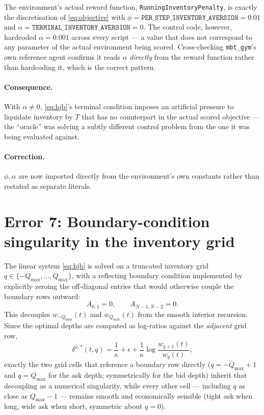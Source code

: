 \documentclass[11pt]{article}
\begin{document}
The environment's actual reward function, \texttt{RunningInventoryPenalty}, is exactly the discretisation of \eqref{eq:objective} with $\phi = \texttt{PER\_STEP\_INVENTORY\_AVERSION} = 0.01$ and $\alpha = \texttt{TERMINAL\_INVENTORY\_AVERSION} = 0$. The control code, however, hardcoded $\alpha = 0.001$ across every script — a value that does not correspond to any parameter of the actual environment being scored. Cross-checking \texttt{mbt\_gym}'s own reference agent confirms it reads $\alpha$ \emph{directly} from the reward function rather than hardcoding it, which is the correct pattern.

\paragraph{Consequence.} With $\alpha \ne 0$, \eqref{eq:hjb}'s terminal condition imposes an artificial pressure to liquidate inventory by $T$ that has no counterpart in the actual scored objective — the ``oracle'' was solving a subtly different control problem from the one it was being evaluated against.

\paragraph{Correction.} $\phi, \alpha$ are now imported directly from the environment's own constants rather than restated as separate literals.

\section{Error 7: Boundary-condition singularity in the inventory grid}
\label{sec:boundary}

The linear system \eqref{eq:hjb} is solved on a truncated inventory grid $q \in \{-Q_{\max}, \dots, Q_{\max}\}$, with a reflecting boundary condition implemented by explicitly zeroing the off-diagonal entries that would otherwise couple the boundary rows outward:
\begin{equation}
A_{0,1} = 0, \qquad A_{N-1,N-2} = 0.
\end{equation}
This decouples $w_{-Q_{\max}}(t)$ and $w_{Q_{\max}}(t)$ from the smooth interior recursion. Since the optimal depths are computed as log-ratios against the \emph{adjacent} grid row,
\begin{equation}
\delta^{a,*}(t,q) = \frac1\kappa + \epsilon + \frac1\kappa \log\frac{w_{q+1}(t)}{w_q(t)},
\end{equation}
exactly the two grid cells that reference a boundary row directly ($q = -Q_{\max}+1$ and $q = Q_{\max}$ for the ask depth; symmetrically for the bid depth) inherit that decoupling as a numerical singularity, while every other cell — including $q$ as close as $Q_{\max}-1$ — remains smooth and economically sensible (tight ask when long, wide ask when short, symmetric about $q=0$).
\end{document}
